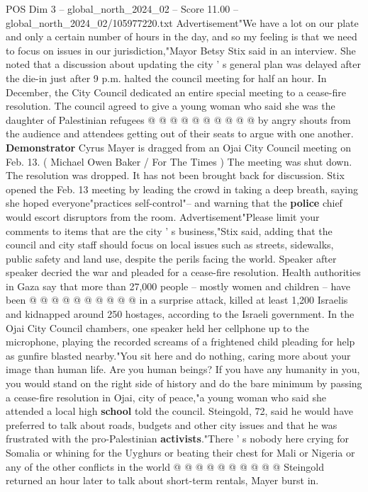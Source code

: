 \begin{textsample}{POS Dim 3 – global\_north\_2024\_02 – Score 11.00 – global\_north\_2024\_02/105977220.txt}
Advertisement"We have a lot on our plate and only a certain number of hours in the day, and so my feeling is that we need to focus on issues in our jurisdiction,"Mayor Betsy Stix said in an interview.
She noted that a discussion about updating the city ' s general plan was delayed after the die-in just after 9 p.m. halted the council meeting for half an hour.
In December, the City Council dedicated an entire special meeting to a cease-fire resolution.
The council agreed to give a young woman who said she was the daughter of Palestinian refugees @ @ @ @ @ @ @ @ @ @ by angry shouts from the audience and attendees getting out of their seats to argue with one another. \textbf{Demonstrator} Cyrus Mayer is dragged from an Ojai City Council meeting on Feb. 13. ( Michael Owen Baker / For The Times ) The meeting was shut down.
The resolution was dropped.
It has not been brought back for discussion.
Stix opened the Feb. 13 meeting by leading the crowd in taking a deep breath, saying she hoped everyone"practices self-control"-- and warning that the \textbf{police} chief would escort disruptors from the room.
Advertisement"Please limit your comments to items that are the city ' s business,"Stix said, adding that the council and city staff should focus on local issues such as streets, sidewalks, public safety and land use, despite the perils facing the world.
Speaker after speaker decried the war and pleaded for a cease-fire resolution.
Health authorities in Gaza say that more than 27,000 people -- mostly women and children -- have been @ @ @ @ @ @ @ @ @ @ in a surprise attack, killed at least 1,200 Israelis and kidnapped around 250 hostages, according to the Israeli government.
In the Ojai City Council chambers, one speaker held her cellphone up to the microphone, playing the recorded screams of a frightened child pleading for help as gunfire blasted nearby."You sit here and do nothing, caring more about your image than human life.
Are you human beings?
If you have any humanity in you, you would stand on the right side of history and do the bare minimum by passing a cease-fire resolution in Ojai, city of peace,"a young woman who said she attended a local high \textbf{school} told the council.
Steingold, 72, said he would have preferred to talk about roads, budgets and other city issues and that he was frustrated with the pro-Palestinian \textbf{activists}."There ' s nobody here crying for Somalia or whining for the Uyghurs or beating their chest for Mali or Nigeria or any of the other conflicts in the world @ @ @ @ @ @ @ @ @ @ Steingold returned an hour later to talk about short-term rentals, Mayer burst in.

\end{textsample}
